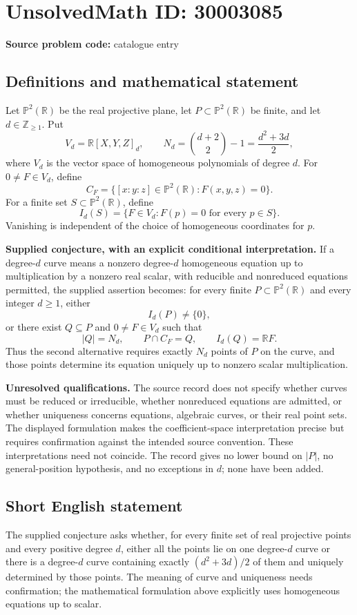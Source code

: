 \documentclass[11pt]{article}
\newcommand{\Z}{\mathbb{Z}}
\newcommand{\R}{\mathbb{R}}
\begin{document}
\section*{UnsolvedMath ID: 30003085}
\textbf{Source problem code:} catalogue entry
\subsection{Definitions and mathematical statement}
Let \(\mathbb{P}^{2}(\R)\) be the real projective plane, let \(P\subset\mathbb{P}^{2}(\R)\) be finite, and let \(d\in\Z_{\geq 1}\). Put
\[
V_d=\R[X,Y,Z]_d,\qquad N_d=\binom{d+2}{2}-1=\frac{d^2+3d}{2},
\]
where \(V_d\) is the vector space of homogeneous polynomials of degree \(d\). For \(0\ne F\in V_d\), define
\[
C_F=\{[x:y:z]\in\mathbb{P}^{2}(\R):F(x,y,z)=0\}.
\]
For a finite set \(S\subset\mathbb{P}^{2}(\R)\), define
\[
I_d(S)=\{F\in V_d:F(p)=0\text{ for every }p\in S\}.
\]
Vanishing is independent of the choice of homogeneous coordinates for \(p\).

\textbf{Supplied conjecture, with an explicit conditional interpretation.} If a degree-\(d\) curve means a nonzero degree-\(d\) homogeneous equation up to multiplication by a nonzero real scalar, with reducible and nonreduced equations permitted, the supplied assertion becomes: for every finite \(P\subset\mathbb{P}^{2}(\R)\) and every integer \(d\geq1\), either
\[
I_d(P)\ne\{0\},
\]
or there exist \(Q\subseteq P\) and \(0\ne F\in V_d\) such that
\[
|Q|=N_d,\qquad P\cap C_F=Q,\qquad I_d(Q)=\R F.
\]
Thus the second alternative requires exactly \(N_d\) points of \(P\) on the curve, and those points determine its equation uniquely up to nonzero scalar multiplication.

\textbf{Unresolved qualifications.} The source record does not specify whether curves must be reduced or irreducible, whether nonreduced equations are admitted, or whether uniqueness concerns equations, algebraic curves, or their real point sets. The displayed formulation makes the coefficient-space interpretation precise but requires confirmation against the intended source convention. These interpretations need not coincide. The record gives no lower bound on \(|P|\), no general-position hypothesis, and no exceptions in \(d\); none have been added.
\subsection{Short English statement}
The supplied conjecture asks whether, for every finite set of real projective points and every positive degree \(d\), either all the points lie on one degree-\(d\) curve or there is a degree-\(d\) curve containing exactly \((d^2+3d)/2\) of them and uniquely determined by those points. The meaning of curve and uniqueness needs confirmation; the mathematical formulation above explicitly uses homogeneous equations up to scalar.
\end{document}
